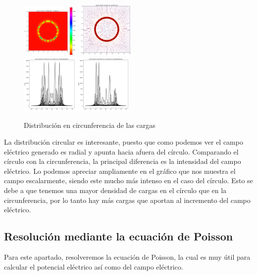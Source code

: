 \documentclass[11pt]{article}
\begin{document}
    \begin{figure}[h]
        \includegraphics[width=0.25\textwidth]{circunferencia2.png}  
        \includegraphics[width=0.25\textwidth]{circunferencia3.png}
        \includegraphics[width=0.5\textwidth]{circunferencia1.png}
        \caption{Distribución en circunferencia de las cargas}
    \end{figure}
        
    
    \vspace{5mm} La distribución circular es interesante, puesto que como podemos ver el campo eléctrico generado es radial y apunta hacia afuera del círculo. Comparando el círculo con la circunferencia, la principal diferencia es la intensidad del campo eléctrico. Lo podemos apreciar ampliamente en el gráfico que nos muestra el campo escalarmente, siendo este mucho más intenso en el caso del círculo. Esto se debe a que tenemos una mayor densidad de cargas en el círculo que en la circunferencia, por lo tanto hay más cargas que aportan al incremento del campo eléctrico.

\clearpage
\subsection{Resolución mediante la ecuación de Poisson}

\vspace{5mm} Para este apartado, resolveremos la ecuación de Poisson, la cual es muy útil para calcular el potencial eléctrico así como del campo eléctrico.
\end{document}
